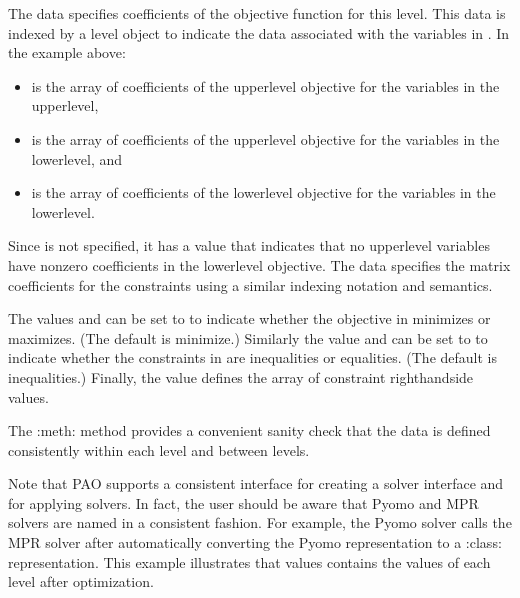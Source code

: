 \documentclass[letterpaper,10pt,english]{sphinxmanual}
\begin{document}
The  data specifies coefficients of the objective function for
this level.  This data is indexed by a level object  to indicate
the data associated with the variables in .  In the example above:
\begin{itemize}
\item {} 
 is the array of coefficients of the upper\sphinxhyphen{}level objective for the variables in the upper\sphinxhyphen{}level,

\item {} 
 is the array of coefficients of the upper\sphinxhyphen{}level objective for the variables in the lower\sphinxhyphen{}level, and

\item {} 
 is the array of coefficients of the lower\sphinxhyphen{}level objective for the variables in the lower\sphinxhyphen{}level.

\end{itemize}

Since  is not specified, it has a value  that
indicates that no upper\sphinxhyphen{}level variables have non\sphinxhyphen{}zero coefficients in the
lower\sphinxhyphen{}level objective.  The  data specifies the matrix coefficients
for the constraints using a similar indexing notation and semantics.

The values  and  can be set to 
to indicate whether the objective in  minimizes or maximizes.
(The default is minimize.)  Similarly the value 
and  can be set to  to indicate whether the
constraints in  are inequalities or equalities.  (The default
is inequalities.)  Finally, the value  defines the array of
constraint right\sphinxhyphen{}hand\sphinxhyphen{}side values.

The :meth: method provides a convenient sanity check that the
data is defined consistently within each level and between levels.

Note that PAO supports a consistent interface for creating a solver
interface and for applying solvers.  In fact, the user should be
aware that Pyomo and MPR solvers are named in a consistent fashion.
For example, the Pyomo solver  calls the MPR solver
 after automatically converting the Pyomo representation
to a :class: representation.  This example
illustrates that values  contains the values of each level
 after optimization.
\end{document}
